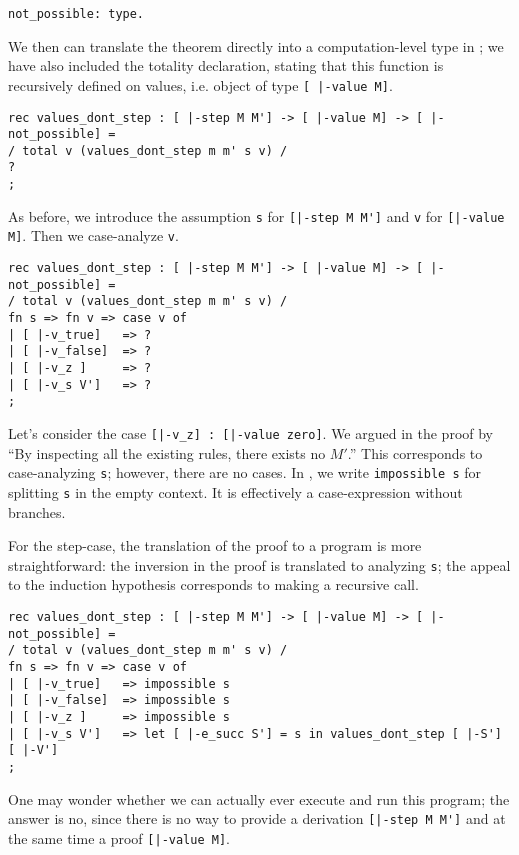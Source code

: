 \begin{lstlisting}
not_possible: type.
\end{lstlisting}

We then can translate the theorem directly into a computation-level type in
\beluga; we have also included the totality  declaration, stating that this
function is recursively defined on values, i.e. object of type \lstinline![ |-value M]!.

\begin{lstlisting}
rec values_dont_step : [ |-step M M'] -> [ |-value M] -> [ |-not_possible] =
/ total v (values_dont_step m m' s v) /
?
;
\end{lstlisting}

As before, we introduce the assumption \lstinline!s! for
\lstinline![|-step M M']! and \lstinline!v! for
\lstinline![|-value M]!. Then we case-analyze \lstinline!v!.

\begin{lstlisting}
rec values_dont_step : [ |-step M M'] -> [ |-value M] -> [ |-not_possible] =
/ total v (values_dont_step m m' s v) /
fn s => fn v => case v of
| [ |-v_true]   => ?
| [ |-v_false]  => ?
| [ |-v_z ]     => ?
| [ |-v_s V']   => ?
;
\end{lstlisting}

Let's consider the case \lstinline![|-v_z] : [|-value zero]!. We argued in the
proof by ``By inspecting all the existing rules, there exists no $M'$.'' This
corresponds to case-analyzing \lstinline!s!; however, there are no cases. In
\beluga, we write \lstinline!impossible s! for splitting \lstinline!s! in
the empty context. It is effectively a case-expression without branches.

For the step-case, the translation of the proof to a program is more
straightforward: the inversion in the proof is translated to analyzing
\lstinline!s!; the appeal to the induction hypothesis corresponds to making a
recursive call.

\begin{lstlisting}
rec values_dont_step : [ |-step M M'] -> [ |-value M] -> [ |-not_possible] =
/ total v (values_dont_step m m' s v) /
fn s => fn v => case v of
| [ |-v_true]   => impossible s 
| [ |-v_false]  => impossible s 
| [ |-v_z ]     => impossible s 
| [ |-v_s V']   => let [ |-e_succ S'] = s in values_dont_step [ |-S'] [ |-V']
;
\end{lstlisting}

One may wonder whether we can actually ever execute and run this program; the
answer is no, since there is no way to provide a derivation
\lstinline![|-step M M']! and at the same time a proof \lstinline![|-value M]!.


